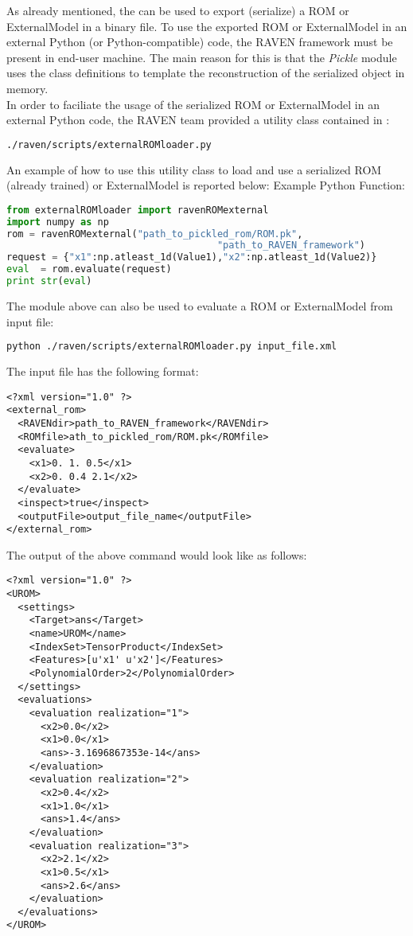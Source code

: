 As already mentioned, the  can be used to export (serialize) a ROM or ExternalModel
in a binary file. To use the exported ROM or ExternalModel in an external Python (or
Python-compatible) code, the RAVEN framework must be present in end-user machine.
The main reason for this is that the \textit{Pickle} module uses the class definitions to template
the reconstruction of the serialized object in memory.
\\ In order to faciliate the usage of the serialized ROM or ExternalModel in an external Python code, the RAVEN
team provided a utility class contained in :
\begin{lstlisting}[language=bash]
 ./raven/scripts/externalROMloader.py
\end{lstlisting}
An example of how to use this utility class to load and use a serialized ROM (already trained) or ExternalModel is reported below:
%
Example Python Function:
\begin{lstlisting}[language=python]
from externalROMloader import ravenROMexternal
import numpy as np
rom = ravenROMexternal("path_to_pickled_rom/ROM.pk",
                                     "path_to_RAVEN_framework")
request = {"x1":np.atleast_1d(Value1),"x2":np.atleast_1d(Value2)}
eval  = rom.evaluate(request)
print str(eval)
\end{lstlisting}

The module above can also be used to evaluate a ROM or ExternalModel from input file:
\begin{lstlisting}[language=bash]
  python ./raven/scripts/externalROMloader.py input_file.xml
\end{lstlisting}
The input file has the following format:
\begin{lstlisting}[style=XML,morekeywords={class}]
<?xml version="1.0" ?>
<external_rom>
  <RAVENdir>path_to_RAVEN_framework</RAVENdir>
  <ROMfile>ath_to_pickled_rom/ROM.pk</ROMfile>
  <evaluate>
    <x1>0. 1. 0.5</x1>
    <x2>0. 0.4 2.1</x2>
  </evaluate>
  <inspect>true</inspect>
  <outputFile>output_file_name</outputFile>
</external_rom>
\end{lstlisting}
The output of the above command would look like as follows:
\begin{lstlisting}[style=XML,morekeywords={class}]
<?xml version="1.0" ?>
<UROM>
  <settings>
    <Target>ans</Target>
    <name>UROM</name>
    <IndexSet>TensorProduct</IndexSet>
    <Features>[u'x1' u'x2']</Features>
    <PolynomialOrder>2</PolynomialOrder>
  </settings>
  <evaluations>
    <evaluation realization="1">
      <x2>0.0</x2>
      <x1>0.0</x1>
      <ans>-3.1696867353e-14</ans>
    </evaluation>
    <evaluation realization="2">
      <x2>0.4</x2>
      <x1>1.0</x1>
      <ans>1.4</ans>
    </evaluation>
    <evaluation realization="3">
      <x2>2.1</x2>
      <x1>0.5</x1>
      <ans>2.6</ans>
    </evaluation>
  </evaluations>
</UROM>
\end{lstlisting}






